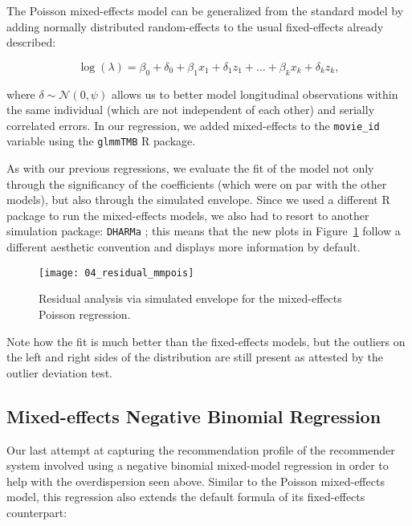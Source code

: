 The Poisson mixed-effects model can be generalized from the standard model by
adding normally distributed random-effects to the usual fixed-effects already
described:


$$
\log(\lambda) = \beta_0 + \delta_0 + \beta_1 x_1 + \delta_1 z_1 + \dots + \beta_k x_k + \delta_k z_k,
$$

\noindent where $\delta \sim \mathcal{N}(0,\psi)$ allows us to better model
longitudinal observations within the same individual (which are not independent
of each other) and serially correlated errors. In our regression, we added
mixed-effects to the \verb|movie_id| variable using the \verb|glmmTMB| \citep{}
R package.

As with our previous regressions, we evaluate the fit of the model not only
through the significancy of the coefficients (which were on par with the other
models), but also through the simulated envelope. Since we used a different R
package to run the mixed-effects models, we also had to resort to another
simulation package: \verb|DHARMa| \citep{}; this means that the new plots in
Figure~\ref{fig:fig04_residual_mmpois} follow a different aesthetic convention
and displays more information by default.

\begin{figure}
  \centering
  \texttt{[image: 04\_residual\_mmpois]}
  \caption{Residual analysis via simulated envelope for the mixed-effects Poisson regression.\label{fig:fig04_residual_mmpois}}
\end{figure}

Note how the fit is much better than the fixed-effects models, but the outliers
on the left and right sides of the distribution are still present as attested by
the outlier deviation test.

\subsection{Mixed-effects Negative Binomial Regression}
\label{subsec:mmnegbin04}

Our last attempt at capturing the recommendation profile of the recommender
system involved using a negative binomial mixed-model regression in order to
help with the overdispersion seen above. Similar to the Poisson mixed-effects
model, this regression also extends the default formula of its fixed-effects
counterpart:


